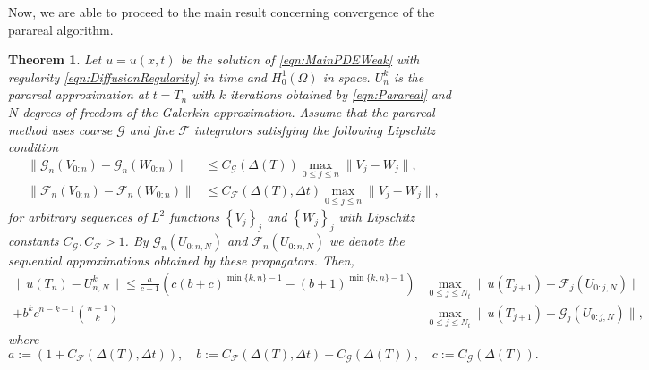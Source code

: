 \documentclass[12pt,a4paper]{article}
\newtheorem{thm}{Theorem}
\begin{document}
Now, we are able to proceed to the main result concerning convergence of the parareal algorithm.

\begin{thm}\label{thm:Convergence}
	Let $u=u(x,t)$ be the solution of \eqref{eqn:MainPDEWeak} with regularity \eqref{eqn:DiffusionRegularity} in time and $H^1_0(\Omega)$ in space. $U^k_n$ is the parareal approximation at $t=T_n$ with $k$ iterations obtained by \eqref{eqn:Parareal} and $N$ degrees of freedom of the Galerkin approximation. Assume that the parareal method uses coarse $\mathcal{G}$ and fine $\mathcal{F}$ integrators satisfying the following Lipschitz condition 
	\begin{equation}
		\begin{split}
			\|\mathcal{G}_n(V_{0:n}) - \mathcal{G}_n(W_{0:n})\| &\leq C_\mathcal{G}(\Delta(T)) \max_{0\leq j\leq n} \|V_j - W_j\|, \\ 
			\|\mathcal{F}_n(V_{0:n}) - \mathcal{F}_n(W_{0:n})\| &\leq C_\mathcal{F}(\Delta(T),\Delta t) \max_{0\leq j\leq n} \|V_j - W_j\|,
		\end{split}
	\end{equation}
	for arbitrary sequences of $L^2$ functions $\left\{V_j\right\}_j$ and $\left\{W_j\right\}_j$ with Lipschitz constants $C_\mathcal{G}, C_\mathcal{F} > 1$. By $\mathcal{G}_n(U_{0:n, N})$ and $\mathcal{F}_n(U_{0:n, N})$ we denote the sequential approximations obtained by these propagators. Then, 
	\begin{equation}\label{eqn:PararealError}
		\begin{split}
			\|u(T_n) - U^k_{n,N}\| \leq \frac{a}{c-1} \left(c(b+c)^{\min\{k,n\}-1} - (b+1)^{\min\{k,n\}-1}\right) &\max_{0\leq j\leq N_t}\|u(T_{j+1}) - \mathcal{F}_j(U_{0:j, N})\| \\
			+b^k c^{n-k-1} \binom{n-1}{k} &\max_{0\leq j\leq N_t}\|u(T_{j+1}) - \mathcal{G}_j(U_{0:j, N})\|,
		\end{split}
	\end{equation}
	where
	\begin{equation}
		a := (1+ C_\mathcal{F}(\Delta(T),\Delta t)), \quad b := C_\mathcal{F}(\Delta(T),\Delta t)+C_\mathcal{G}(\Delta(T)), \quad c := C_\mathcal{G}(\Delta(T)).
	\end{equation}
\end{thm}
\end{document}
